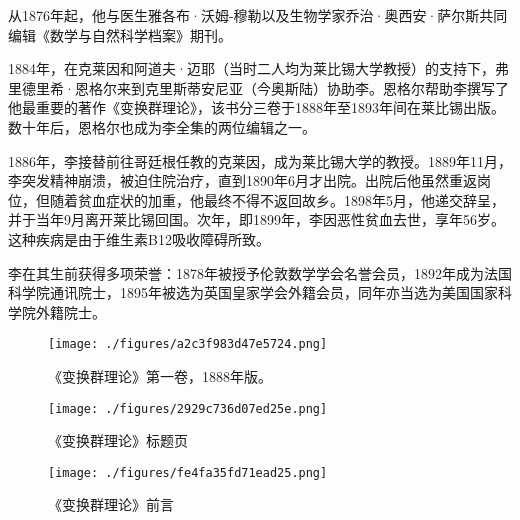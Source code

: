 从1876年起，他与医生雅各布·沃姆-穆勒以及生物学家乔治·奥西安·萨尔斯共同编辑《数学与自然科学档案》期刊。

1884年，在克莱因和阿道夫·迈耶（当时二人均为莱比锡大学教授）的支持下，弗里德里希·恩格尔来到克里斯蒂安尼亚（今奥斯陆）协助李。恩格尔帮助李撰写了他最重要的著作《变换群理论》，该书分三卷于1888年至1893年间在莱比锡出版。数十年后，恩格尔也成为李全集的两位编辑之一。

1886年，李接替前往哥廷根任教的克莱因，成为莱比锡大学的教授。1889年11月，李突发精神崩溃，被迫住院治疗，直到1890年6月才出院。出院后他虽然重返岗位，但随着贫血症状的加重，他最终不得不返回故乡。1898年5月，他递交辞呈，并于当年9月离开莱比锡回国。次年，即1899年，李因恶性贫血去世，享年56岁。这种疾病是由于维生素B12吸收障碍所致。

李在其生前获得多项荣誉：1878年被授予伦敦数学学会名誉会员，1892年成为法国科学院通讯院士，1895年被选为英国皇家学会外籍会员，同年亦当选为美国国家科学院外籍院士。
\begin{figure}[ht]
\centering
\texttt{[image: ./figures/a2c3f983d47e5724.png]}
\caption{《变换群理论》第一卷，1888年版。} \label{fig_SFSL_2}
\end{figure}
\begin{figure}[ht]
\centering
\texttt{[image: ./figures/2929c736d07ed25e.png]}
\caption{《变换群理论》标题页} \label{fig_SFSL_3}
\end{figure}
\begin{figure}[ht]
\centering
\texttt{[image: ./figures/fe4fa35fd71ead25.png]}
\caption{《变换群理论》前言} \label{fig_SFSL_4}
\end{figure}